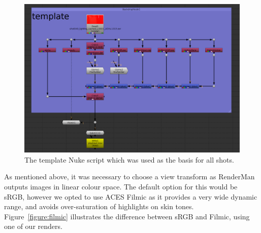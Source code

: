\documentclass[11pt]{article}
\begin{document}
\begin{figure}[htbp]\centering
	\includegraphics[width=1.0\linewidth]{images/compTemplate.png}
	\caption{\label{figure:compTemplate} The template Nuke script which was used as the basis for all shots.}
\end{figure}

As mentioned above, it was necessary to choose a view transform as RenderMan outputs images in linear colour space. The default option for this would be sRGB, however we opted to use ACES Filmic as it provides a very wide dynamic range, and avoids over-saturation of highlights on skin tones. Figure~\ref{figure:filmic} illustrates the difference between sRGB and Filmic, using one of our renders.
\end{document}

